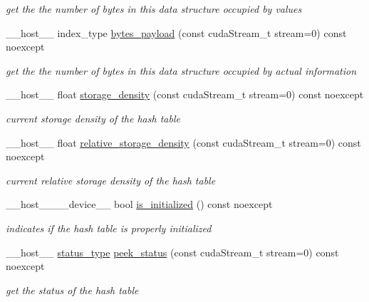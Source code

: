 \begin{DoxyCompactItemize}
\begin{DoxyCompactList}\small\item\em get the the number of bytes in this data structure occupied by values \end{DoxyCompactList}\item 
\+\_\+\+\_\+host\+\_\+\+\_\+ index\+\_\+type \hyperlink{classwarpcore_1_1BucketListHashTable_a3ac40e9655bfc27d3f21e0ea38b3d29d}{bytes\+\_\+payload} (const cuda\+Stream\+\_\+t stream=0) const noexcept
\begin{DoxyCompactList}\small\item\em get the the number of bytes in this data structure occupied by actual information \end{DoxyCompactList}\item 
\+\_\+\+\_\+host\+\_\+\+\_\+ float \hyperlink{classwarpcore_1_1BucketListHashTable_a7c08b3793ff8eaac76009fdf8299f6b6}{storage\+\_\+density} (const cuda\+Stream\+\_\+t stream=0) const noexcept
\begin{DoxyCompactList}\small\item\em current storage density of the hash table \end{DoxyCompactList}\item 
\+\_\+\+\_\+host\+\_\+\+\_\+ float \hyperlink{classwarpcore_1_1BucketListHashTable_a7c5ccd6a8c7976db19951ea0ecd3aafc}{relative\+\_\+storage\+\_\+density} (const cuda\+Stream\+\_\+t stream=0) const noexcept
\begin{DoxyCompactList}\small\item\em current relative storage density of the hash table \end{DoxyCompactList}\item 
\+\_\+\+\_\+host\+\_\+\+\_\+\+\_\+\+\_\+device\+\_\+\+\_\+ bool \hyperlink{classwarpcore_1_1BucketListHashTable_abcfec81d3cac942d01868bb05080beab}{is\+\_\+initialized} () const noexcept
\begin{DoxyCompactList}\small\item\em indicates if the hash table is properly initialized \end{DoxyCompactList}\item 
\+\_\+\+\_\+host\+\_\+\+\_\+ \hyperlink{classwarpcore_1_1Status}{status\+\_\+type} \hyperlink{classwarpcore_1_1BucketListHashTable_a25416b0266a4e91d8d85e1ee6571508c}{peek\+\_\+status} (const cuda\+Stream\+\_\+t stream=0) const noexcept
\begin{DoxyCompactList}\small\item\em get the status of the hash table \end{DoxyCompactList}\item 

\end{DoxyCompactItemize}
